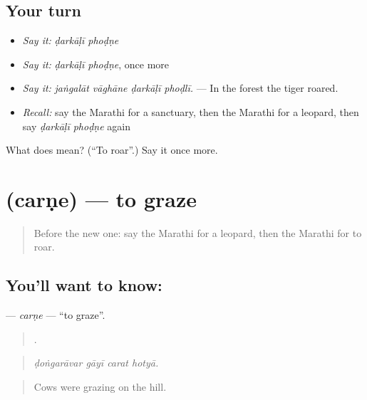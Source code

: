\subsection*{Your turn}
\begin{itemize}
\raggedright
  \item \emph{Say it:} \emph{ḍarkāḷī phoḍṇe}
  \item \emph{Say it:} \emph{ḍarkāḷī phoḍṇe}, once more
  \item \emph{Say it:} \emph{jaṅgalāt vāghāne ḍarkāḷī phoḍlī.} — In the forest the tiger roared.
  \item \emph{Recall:} say the Marathi for a sanctuary, then the Marathi for a leopard, then say \emph{ḍarkāḷī phoḍṇe} again
\end{itemize}

\begin{tcolorbox}[breakable,colback=teal!4,colframe=teal!35!black,title={Before you move on}]
What does   mean? (\textquotedblleft{}To roar\textquotedblright{}.) Say it once more.
\end{tcolorbox}
\section[\texorpdfstring{\mr{चरणे} (carṇe)}{चरणे (carṇe)}]{ (carṇe) — to graze}

\label{lesson:MR-C446-carne}



\begin{quote}
Before the new one: say the Marathi for a leopard, then the Marathi for to roar.
\end{quote}

\subsection*{You'll want to know: }
\textbf{} — \emph{carṇe} — \textquotedblleft{}to graze\textquotedblright{}.

\begin{quote}
   .
\end{quote}

\begin{quote}
\emph{ḍoṅgarāvar gāyī carat hotyā.}
\end{quote}

\begin{quote}
Cows were grazing on the hill.
\end{quote}

